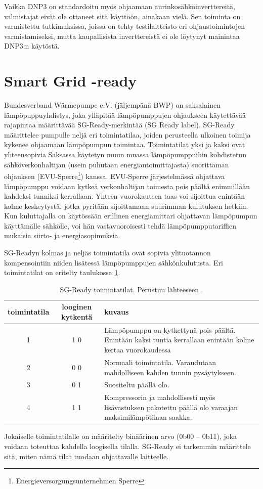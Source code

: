   Vaikka DNP3 on standardoitu myös ohjaamaan aurinkosähköinverttereitä, valmistajat eivät ole ottaneet sitä käyttöön, ainakaan vielä. Sen toiminta on varmistettu tutkimuksissa, joissa on tehty testilaitteisto eri ohjaustoimintojen varmistamiseksi, mutta kaupallisista inverttereistä ei ole löytynyt mainintaa DNP3:n käytöstä. \parencite{DNP3Inv}


\section{Smart Grid -ready}

  Bundesverband Wärmepumpe e.V. (jäljempänä BWP) on saksalainen lämpöpuppuyhdistys, joka ylläpitää lämpöpumppujen ohjaukseen käytettävää rajapintaa määrittävää \gls{SG}-Ready-merkintää (\gls{SG} Ready label). \gls{SG}-Ready määrittelee pumpulle neljä eri toimintatilaa, joiden perusteella ulkoinen toimija kykenee ohjaamaan lämpöpumpun toimintaa. Toimintatilat yksi ja kaksi ovat yhteensopivia Saksassa käytetyn muun muassa lämpöpumppuihin kohdistetun sähköverkonhaltijan (usein puhutaan energiantoimittajasta) suorittaman ohjauksen (EVU-Sperre\footnote{Energieversorgungsunternehmen Sperre}) kanssa.\parencite{SGReadyReg} EVU-Sperre järjestelmässä ohjattava lämpöpumppu voidaan kytkeä verkonhaltijan toimesta pois päältä enimmillään kahdeksi tunniksi kerrallaan. Yhteen vuorokauteen taas voi sijoittua enintään kolme keskeytystä, jotka pyritään sijoittamaan suurimman kulutuksen hetkiin. Kun kuluttajalla on käytössään erillinen energiamittari ohjattavan lämpöpumpun käyttämälle sähkölle, voi hän vastavuoroisesti tehdä lämpöpumpputariffien mukaisia siirto- ja energiasopimuksia. \parencite{enwg, VDEARN4100}

  SG-Readyn  kolmas ja neljäs toimintatila ovat sopivia ylituotannon kompensointiin niiden lisätessä lämpöpumppujen sähkönkulutusta. Eri toimintatilat on eritelty taulukossa \ref{sgready}.
  \begin{table}[h]
    \centering
    \caption[\gls{SG}-Ready toimintatilat]{\gls{SG}-Ready toimintatilat. Perustuu lähteeseen \parencite{SGReadyReg}.}
    \begin{tabular}{|c|c|p{3in}|}
      \hline
      \rowcolor{lightgray} toimintatila & looginen kytkentä & kuvaus \\\hline
      1 & 1 0 & Lämpöpumppu on kytkettynä pois päältä. Enintään kaksi tuntia kerrallaan enintään kolme kertaa vuorokaudessa \\\hline
      2 & 0 0 & Normaali toimintatila. Varaudutaan mahdolliseen kahden tunnin pysäytykseen. \\\hline
      3 & 0 1 & Suositeltu päällä olo. \\ \hline
      4 & 1 1 & Kompressorin ja mahdollisesti myös lisävastuksen pakotettu päällä olo varaajan maksimilämpötilaan saakka. \\\hline
    \end{tabular}
    \label{sgready}
  \end{table}
  Jokaiselle toimintatilalle on määritelty binäärinen arvo (0b00 -- 0b11), joka voidaan toteuttaa kahdella loogisella tilalla. SG-Ready ei tarkemmin määrittele sitä, miten nämä tilat tuodaan ohjattavalle laitteelle. \parencite{SGReadyReg}

